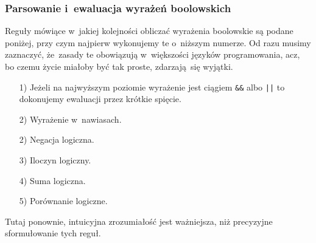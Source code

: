 \documentclass[10pt,t]{beamer}
\begin{document}
\begin{frame}
  \frametitle{Parsowanie i~ewaluacja wyrażeń boolowskich}


  Reguły mówiące w~jakiej kolejności obliczać wyrażenia boolowskie
  są podane poniżej, przy czym najpierw wykonujemy te o~niższym numerze.
  Od razu musimy zaznaczyć, że~zasady te obowiązują w~większości języków
  programowania, acz, bo czemu życie miałoby być tak proste, zdarzają~się
  wyjątki.

  \begin{itemize}

  \item[1)] Jeżeli na najwyższym poziomie wyrażenie jest ciągiem
    \texttt{\&\&} albo \texttt{||} to dokonujemy ewaluacji przez krótkie
    spięcie.



  \item[2)] Wyrażenie w~nawiasach.



  \item[2)] Negacja logiczna.



  \item[3)] Iloczyn logiczny.



  \item[4)] Suma logiczna.



  \item[5)] Porównanie logiczne.

  \end{itemize}

  Tutaj ponownie, intuicyjna zrozumiałość jest ważniejsza, niż precyzyjne
  sformułowanie tych reguł.

\end{frame}
\end{document}
